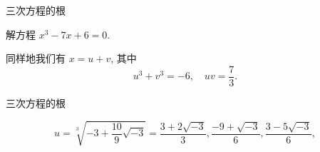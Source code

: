 \begin{frame}{三次方程的根}
\onslide<+->
\begin{example}
解方程 $x^3-7x+6=0$.
\end{example}
\onslide<+->
\begin{solution}
\indent 同样地我们有 $x=u+v$, 其中
	\[u^3+v^3=-6,\quad uv=\frac73.\]

\vspace{-1.3\baselineskip}
\end{solution}
\end{frame}


\begin{frame}{三次方程的根}
\onslide<+->
\begin{solutionc}
	\[u=\sqrt[3]{-3+\frac{10}9\sqrt{-3}}
	=\frac{3+2\sqrt{-3}}3,\frac{-9+\sqrt{-3}}6,\frac{3-5\sqrt{-3}}6,\]
\visible<+->{相应地
	\[v=\frac{3-2\sqrt{-3}}3,\frac{-9-\sqrt{-3}}6,\frac{3+5\sqrt{-3}}6,\]}
\visible<+->{\[x=u+v=2,-3,1.\]}
\vspace{-\baselineskip}
\end{solutionc}
\end{frame}


